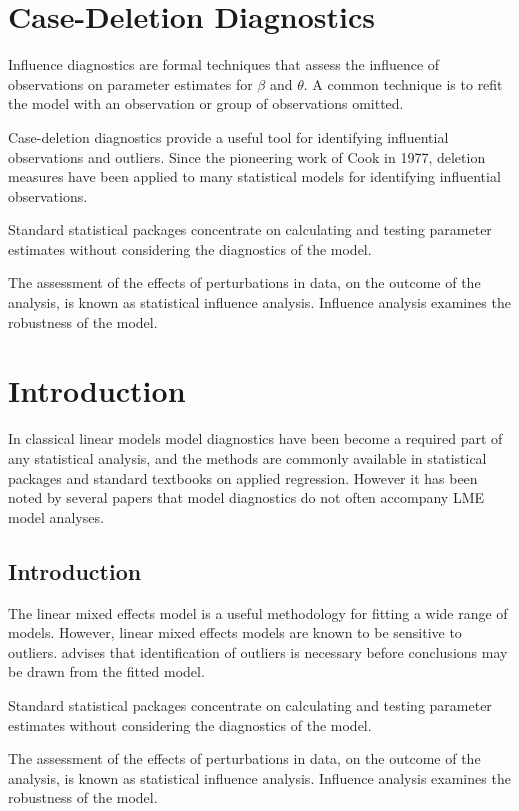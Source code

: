 \documentclass[12pt, a4paper]{article}
\begin{document}
	

\section{Case-Deletion Diagnostics}
Influence diagnostics are formal techniques that assess the influence of observations on parameter estimates for $\beta$ and $\theta$. A common technique is to refit the model with an observation or group of observations omitted.

Case-deletion diagnostics provide a useful tool for identifying influential observations and outliers. Since the pioneering work of Cook in 1977, deletion measures have been applied to many statistical models for identifying influential observations.


Standard statistical packages concentrate on calculating and testing parameter estimates without considering the diagnostics of the model. 

The assessment of the effects of perturbations in data, on the outcome of the analysis, is known as statistical influence analysis. Influence analysis examines the robustness of the model.


\section{Introduction}%
In classical linear models model diagnostics have been become a required part of any statistical analysis, and the methods are commonly available in statistical packages and standard textbooks on applied regression. However it has been noted by several papers that model diagnostics do not often accompany LME model analyses.
\subsection{Introduction }
The linear mixed effects model is a useful methodology for fitting a wide range of models. However, linear mixed effects models are known to be sensitive to outliers. \citet{christensen} advises that identification of outliers is necessary before conclusions may be drawn from the fitted model.

Standard statistical packages concentrate on calculating and testing parameter estimates without considering the diagnostics of the model.

The assessment of the effects of perturbations in data, on the outcome of the analysis, is known as statistical influence analysis. Influence analysis examines the robustness of the model.
\end{document}
